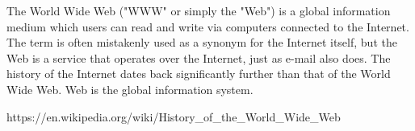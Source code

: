 The World Wide Web ("WWW" or simply the "Web") is a global information medium which users can read and write via computers connected to the Internet. The term is often mistakenly used as a synonym for the Internet itself, but the Web is a service that operates over the Internet, just as e-mail also does. The history of the Internet dates back significantly further than that of the World Wide Web. Web is the global information system.

https://en.wikipedia.org/wiki/History_of_the_World_Wide_Web